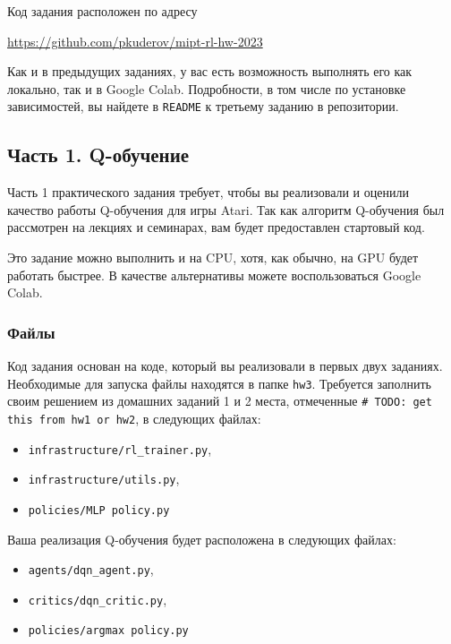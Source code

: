 \documentclass[12pt, oneside]{article}
\begin{document}
Код задания расположен по адресу
\begin{center}
    \href{https://github.com/pkuderov/mipt-rl-hw-2023}{https://github.com/pkuderov/mipt-rl-hw-2023}
\end{center}

Как и в предыдущих заданиях, у вас есть возможность выполнять его как локально, так и в Google Colab. Подробности, в том числе по установке зависимостей, вы найдете в \verb|README| к третьему заданию в репозитории.

\subsection{Часть 1. Q-обучение}

Часть 1 практического задания требует, чтобы вы реализовали и оценили качество работы Q-обучения для игры Atari. Так как алгоритм Q-обучения был рассмотрен на лекциях и семинарах, вам будет предоставлен стартовый код.

Это задание можно выполнить и на CPU, хотя, как обычно, на GPU будет работать быстрее. В качестве альтернативы можете воспользоваться Google Colab.

\subsubsection{Файлы}

Код задания основан на коде, который вы реализовали в первых двух заданиях. Необходимые для запуска файлы находятся в папке \verb|hw3|. Требуется заполнить своим решением из домашних заданий 1 и 2 места, отмеченные \verb|# TODO: get this from hw1 or hw2|, в следующих файлах:

\begin{itemize}
    \item \verb|infrastructure/rl_trainer.py|,
    \item \verb|infrastructure/utils.py|,
    \item \verb|policies/MLP policy.py|
\end{itemize}

Ваша реализация Q-обучения будет расположена в следующих файлах:

\begin{itemize}
    \item \verb|agents/dqn_agent.py|,
    \item \verb|critics/dqn_critic.py|,
    \item \verb|policies/argmax policy.py|
\end{itemize}
\end{document}
